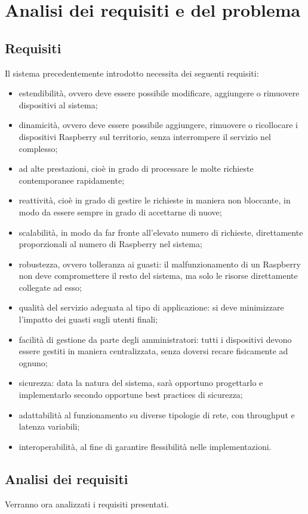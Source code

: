 \chapter{Analisi dei requisiti e del problema}

\section{Requisiti}

Il sistema precedentemente introdotto necessita dei seguenti requisiti:
\begin{itemize}
 \item estendibilità, ovvero deve essere possibile modificare, aggiungere o rimuovere dispositivi al sistema;
 \item dinamicità, ovvero deve essere possibile aggiungere, rimuovere o ricollocare i dispositivi Raspberry sul territorio, senza interrompere il servizio nel complesso;
 \item ad alte prestazioni, cioè in grado di processare le molte richieste contemporanee rapidamente;
 \item reattività, cioè in grado di gestire le richieste in maniera non bloccante, in modo da essere sempre in grado di accettarne di nuove;
 \item scalabilità, in modo da far fronte all’elevato numero di richieste, direttamente proporzionali al numero di Raspberry nel sistema;
 \item robustezza, ovvero tolleranza ai guasti: il malfunzionamento di un Raspberry non deve compromettere il resto del sistema, ma solo le risorse direttamente collegate ad esso;
 \item qualità del servizio adeguata al tipo di applicazione: si deve minimizzare l'impatto dei guasti sugli utenti finali;
 \item facilità di gestione da parte degli amministratori: tutti i dispositivi devono essere gestiti in maniera centralizzata, senza doversi recare fisicamente ad ognuno;
 \item sicurezza: data la natura del sistema, sarà opportuno progettarlo e implementarlo secondo opportune best practices di sicurezza;
 \item adattabilità al funzionamento su diverse tipologie di rete, con throughput e latenza variabili;
 \item interoperabilità, al fine di garantire flessibilità nelle implementazioni.
\end{itemize}

\section{Analisi dei requisiti}
Verranno ora analizzati i requisiti presentati.
